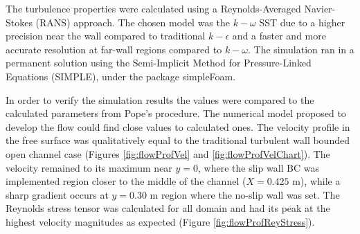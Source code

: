 \begin{refsection}
The turbulence properties were calculated using a Reynolds-Averaged Navier-Stokes (RANS) approach. The chosen model was the $ k-\omega$ SST due to a higher precision near the wall compared to traditional $k-\epsilon$ and a faster and more accurate resolution at far-wall regions compared to $k-\omega$. The simulation ran in a permanent solution using the Semi-Implicit Method for Pressure-Linked Equations (SIMPLE), under the package simpleFoam.

In order to verify the simulation results  the values were compared to the calculated parameters from Pope's procedure. The numerical model proposed to develop the flow could find close values to calculated ones. The velocity profile in the free surface was qualitatively equal to the traditional turbulent wall bounded open channel case (Figures \ref{fig:flowProfVel} and \ref{fig:flowProfVelChart}). The velocity remained to its maximum near $y=0$, where the slip wall BC was implemented region closer to the middle of the channel ($X=0.425$ m), while a sharp gradient occurs at $y=0.30$ m region where the no-slip wall was set. The Reynolds stress tensor was calculated for all domain and had its peak at the highest velocity magnitudes as expected (Figure \ref{fig:flowProfReyStress}).


\end{refsection}
